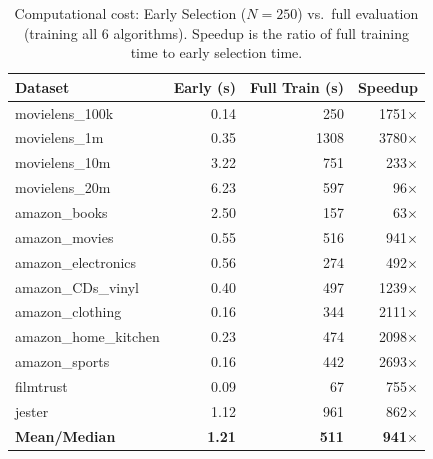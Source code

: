 \begin{table}[htbp]
\centering
\caption{Computational cost: Early Selection ($N\!=\!250$) vs.\ full evaluation (training all 6 algorithms). Speedup is the ratio of full training time to early selection time.}
\label{tab:cost}
\begin{tabular}{lrrr}
\toprule
Dataset & Early (s) & Full Train (s) & Speedup \\
\midrule
movielens\_100k & 0.14 & 250 & 1751$\times$ \\
movielens\_1m & 0.35 & 1308 & 3780$\times$ \\
movielens\_10m & 3.22 & 751 & 233$\times$ \\
movielens\_20m & 6.23 & 597 & 96$\times$ \\
amazon\_books & 2.50 & 157 & 63$\times$ \\
amazon\_movies & 0.55 & 516 & 941$\times$ \\
amazon\_electronics & 0.56 & 274 & 492$\times$ \\
amazon\_CDs\_vinyl & 0.40 & 497 & 1239$\times$ \\
amazon\_clothing & 0.16 & 344 & 2111$\times$ \\
amazon\_home\_kitchen & 0.23 & 474 & 2098$\times$ \\
amazon\_sports & 0.16 & 442 & 2693$\times$ \\
filmtrust & 0.09 & 67 & 755$\times$ \\
jester & 1.12 & 961 & 862$\times$ \\
\midrule
\textbf{Mean/Median} & \textbf{1.21} & \textbf{511} & \textbf{941$\times$} \\
\bottomrule
\end{tabular}
\end{table}